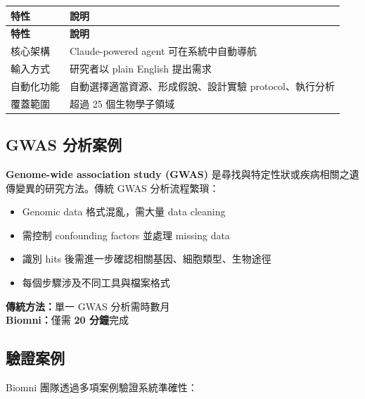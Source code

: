\documentclass[12pt,a4paper]{article}
\begin{document}
\begin{longtable}{p{4cm}p{10cm}}
\toprule
\textbf{特性} & \textbf{說明} \\
\midrule
\endfirsthead

\toprule
\textbf{特性} & \textbf{說明} \\
\midrule
\endhead

\bottomrule
\endfoot

核心架構 & Claude-powered agent 可在系統中自動導航 \\
\midrule
輸入方式 & 研究者以 plain English 提出需求 \\
\midrule
自動化功能 & 自動選擇適當資源、形成假說、設計實驗 protocol、執行分析 \\
\midrule
覆蓋範圍 & 超過 25 個生物學子領域 \\
\bottomrule
\end{longtable}

\subsection{GWAS 分析案例}

\textbf{Genome-wide association study (GWAS)} 是尋找與特定性狀或疾病相關之遺傳變異的研究方法。傳統 GWAS 分析流程繁瑣：

\begin{itemize}
    \item Genomic data 格式混亂，需大量 data cleaning
    \item 需控制 confounding factors 並處理 missing data
    \item 識別 hits 後需進一步確認相關基因、細胞類型、生物途徑
    \item 每個步驟涉及不同工具與檔案格式
\end{itemize}

\begin{tcolorbox}[colback=highlight_yellow,colframe=emergency_red,title=\textbf{效率比較}]
\textbf{傳統方法：}單一 GWAS 分析需時數月\\
\textbf{Biomni：}僅需 \textbf{20 分鐘}完成
\end{tcolorbox}

\subsection{驗證案例}

Biomni 團隊透過多項案例驗證系統準確性：
\end{document}
